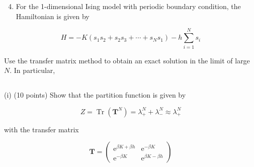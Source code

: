 \documentclass[12pt]{article}
\begin{document}
\section{}
\begin{enumerate}
  \setcounter{enumi}{3}
  \item For the 1-dimensional Ising model with periodic boundary condition, the Hamiltonian is given by
\end{enumerate}


\begin{equation*}
H=-K\left(s_{1} s_{2}+s_{2} s_{3}+\cdots+s_{N} s_{1}\right)-h \sum_{i=1}^{N} s_{i} \tag{3}
\end{equation*}


Use the transfer matrix method to obtain an exact solution in the limit of large $N$. In particular,
\subsection{}
(i) (10 points) Show that the partition function is given by


\begin{equation*}
Z=\operatorname{Tr}\left(\mathbf{T}^{N}\right)=\lambda_{+}^{N}+\lambda_{-}^{N} \approx \lambda_{+}^{N} \tag{4}
\end{equation*}


with the transfer matrix

\[
\mathbf{T}=\left(\begin{array}{cc}
\mathrm{e}^{\beta K+\beta h} & \mathrm{e}^{-\beta K}  \tag{5}\\
\mathrm{e}^{-\beta K} & \mathrm{e}^{\beta K-\beta h}
\end{array}\right)
\]
\end{document}
